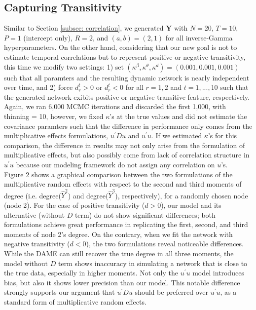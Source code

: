 \documentclass[a4paper]{article}
\begin{document}
\subsection{Capturing Transitivity} \label{subsec: negative transitivity}
Similar to Section \ref{subsec: correlation}, we generated  $\mathbf{Y}$ with $N=20$, $T=10$, $P=1$ (intercept only), $R=2$, and $(a, b) = (2, 1)$ for all inverse-Gamma hyperparameters. On the other hand, considering that our new goal is not to estimate temporal correlations but to represent positive or negative transitivity, this time we modify two settings: 1) set $(\kappa^\beta, \kappa^\theta, \kappa^d) = (0.001, 0.001, 0.001)$ such that all paramters and the resulting dynamic network is nearly independent over time, and 2) force $d^t_{r} > 0$ or $d^t_{r} <0$ for all $r=1,2$ and $t=1,...,10$ such that the generated network exibits positive or negative transitive feature, respectively. Again, we ran 6,000 MCMC iterations and discarded the first 1,000, with thinning = 10, however, we fixed $\kappa$'s at the true values and did not estimate the covariance paramters such that the difference in performance only comes from the multiplicative effects formulations, $u^\prime Du$ and $u^\prime u$. If we estimated $\kappa$'s for this comparison, the difference in results may not only arise from the formulation of multiplicative effects, but also possibly come from lack of correlation structure in $u^\prime u$ because our modeling framework do not assign any correlation on $u$'s.   \\ \newline 
Figure 2 shows a graphical comparison between the two formulations of the multiplicative random effects with respect to the second and third moments of degree (i.e. degree($\hat{Y}^2$) and degree($\hat{Y}^3$), respectively), for a randomly chosen node (node 2). For the case of positive transitivity ($d > 0$), our model and its alternative (without $D$ term) do not show significant differences; both formulations achieve great performance in replicating the first, second, and third moments of node 2's degree. On the contrary, when we fit the network with negative transitivity ($d < 0$), the two formulations reveal noticeable differences. While the DAME can still recover the true degree in all three moments, the model without $D$ term shows inaccuracy in simulating a network that is close to the true data, especially in higher moments. Not only the $u^\prime u$ model introduces bias, but also it shows lower precision than our model. This notable difference strongly supports our argument that $u^\prime Du$ should be preferred over $u^\prime u$, as a standard form of multiplicative random effects.
\end{document}
